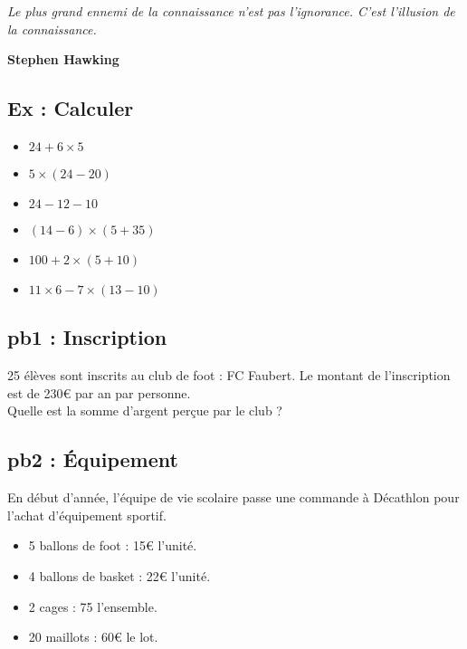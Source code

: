 



\begin{center}
  \textit{Le plus grand ennemi de la connaissance n'est pas l'ignorance. C'est l'illusion de la connaissance.} 
  
  \textbf{Stephen Hawking}
\end{center}

\subsection*{Ex : Calculer} 


\begin{itemize}[label={$\bullet$}]
  \item $24 + 6 \times 5$ \\
  \item $5 \times (24 - 20)$ \\
  \item $24 - 12 - 10$ \\ 
  \item $(14 - 6) \times (5 + 35)$ \\
  \item $100 + 2 \times (5 + 10)$ \\ 
  \item $11 \times 6 - 7 \times (13 - 10)$ 
\end{itemize}


\subsection*{pb1 : Inscription} 

25 élèves sont inscrits au club de foot : FC Faubert. Le montant de l'inscription est de 230€ par an par personne.\\ 

Quelle est la somme d'argent perçue par le club ?


\subsection*{pb2 : Équipement} 

En début d'année, l'équipe de vie scolaire passe une commande à Décathlon pour l'achat d'équipement sportif.

\begin{itemize}[label={$\bullet$}]
  \item 5 ballons de foot : 15€ l'unité.
  \item 4 ballons de basket : 22€ l'unité.
  \item 2 cages : 75 l'ensemble. 
  \item 20 maillots : 60€ le lot. 
\end{itemize} 


